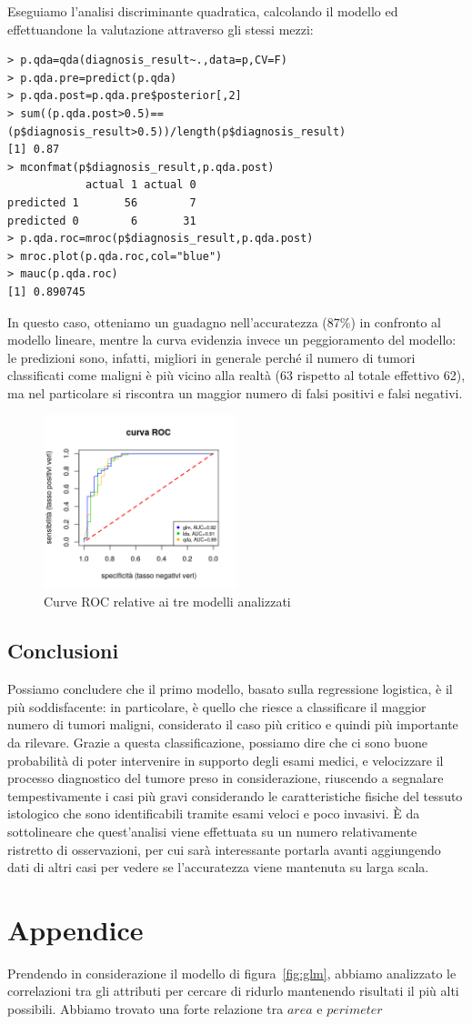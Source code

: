 \documentclass[11pt,a4paper,oneside]{article}
\begin{document}
Eseguiamo l'analisi discriminante quadratica, calcolando il modello ed effettuandone la valutazione attraverso gli stessi mezzi:
\begin{verbatim}
> p.qda=qda(diagnosis_result~.,data=p,CV=F)
> p.qda.pre=predict(p.qda)
> p.qda.post=p.qda.pre$posterior[,2]
> sum((p.qda.post>0.5)==(p$diagnosis_result>0.5))/length(p$diagnosis_result)
[1] 0.87
> mconfmat(p$diagnosis_result,p.qda.post)
            actual 1 actual 0
predicted 1       56        7
predicted 0        6       31
> p.qda.roc=mroc(p$diagnosis_result,p.qda.post)
> mroc.plot(p.qda.roc,col="blue")
> mauc(p.qda.roc)
[1] 0.890745
\end{verbatim}
In questo caso, otteniamo un guadagno nell'accuratezza (87\%) in confronto al modello lineare, mentre la curva evidenzia invece un peggioramento del modello: le predizioni sono, infatti, migliori in generale perché il numero di tumori classificati come maligni è più vicino alla realtà (63 rispetto al totale effettivo 62), ma nel particolare si riscontra un maggior numero di falsi positivi e falsi negativi.
\begin{figure}[h]
\centering
\includegraphics[width=0.5\textwidth]{images/curveROC}
\caption{Curve ROC relative ai tre modelli analizzati}
\label{fig:curveROC}
\end{figure}

\subsection{Conclusioni}
Possiamo concludere che il primo modello, basato sulla regressione logistica, è il più soddisfacente: in particolare, è quello che riesce a classificare il maggior numero di tumori maligni, considerato il caso più critico e quindi più importante da rilevare. Grazie a questa classificazione, possiamo dire che ci sono buone probabilità di poter intervenire in supporto degli esami medici, e velocizzare il processo diagnostico del tumore preso in considerazione, riuscendo a segnalare tempestivamente i casi più gravi considerando le caratteristiche fisiche del tessuto istologico che sono identificabili tramite esami veloci e poco invasivi. È da sottolineare che quest'analisi viene effettuata su un numero relativamente ristretto di osservazioni, per cui sarà interessante portarla avanti aggiungendo dati di altri casi per vedere se l'accuratezza viene mantenuta su larga scala.

\section{Appendice}
Prendendo in considerazione il modello di figura~\vref{fig:glm}, abbiamo analizzato le correlazioni tra gli attributi per cercare di ridurlo mantenendo risultati il più alti possibili. Abbiamo trovato una forte relazione tra $area$ e $perimeter$
\end{document}
